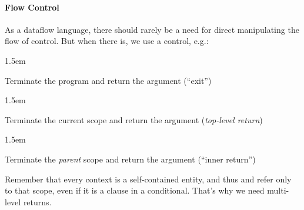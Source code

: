 \documentclass[preprint]{{acmart}}
\begin{document}
\paragraph{Flow Control}\label{sec-flow-control}%

\noindent{}As a dataflow language, there should rarely be a need for direct
manipulating the flow of control. But when there is, we use a control, e.g.:%

\begin{mddefinitions}%


\begin{mdbmarginx}{}{}{}{1.5em}%
\begin{mddefdata}%
Terminate the program and return the argument (\textquotedblleft{}exit\textquotedblright{})
\end{mddefdata}%
\end{mdbmarginx}%


\begin{mdbmarginx}{}{}{}{1.5em}%
\begin{mddefdata}%
Terminate the current scope and return the argument (\emph{top-level return})
\end{mddefdata}%
\end{mdbmarginx}%


\begin{mdbmarginx}{}{}{}{1.5em}%
\begin{mddefdata}%
Terminate the \emph{parent} scope and return the argument (\textquotedblleft{}inner return\textquotedblright{})%
\end{mddefdata}%
\end{mdbmarginx}%
\end{mddefinitions}%

\noindent{}Remember that every context is a self-contained entity, and thus  and  refer 
only to that scope, even if it is a clause in a conditional.  That's why we need 
multi-level returns.%
\end{document}
